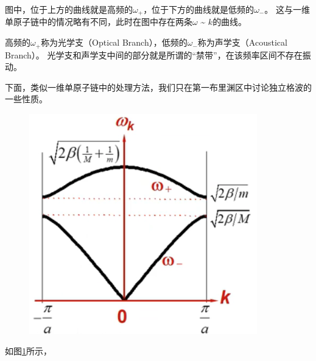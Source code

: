 \documentclass[declarePage]{ecnuthesis}
\begin{document}
图中，位于上方的曲线就是高频的$\omega_+$，位于下方的曲线就是低频的$\omega_-$。%
这与一维单原子链中的情况略有不同，此时在图中存在两条$\omega$ \~{} $k$的曲线。

高频的$\omega_+$称为光学支（Optical Branch），低频的$\omega_-$称为声学支（Acoustical Branch）。%
光学支和声学支中间的部分就是所谓的“禁带”，在该频率区间不存在振动。

下面，类似一维单原子链中的处理方法，我们只在第一布里渊区中讨论独立格波的一些性质。
\begin{figure}[htb]
    \centering
    \includegraphics[width=.33\textwidth]{1DDCDR1.png}
     \label{1DDCDR1}
\end{figure}

如图\ref{1DDCDR1}所示，

\backmatter
\PrintReference
\end{document}
